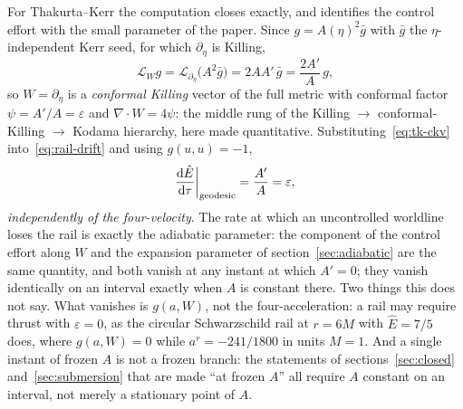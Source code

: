 \documentclass[12pt]{iopart}
\theoremstyle{plain}
\theoremstyle{definition}
\theoremstyle{remark}
\newcommand{\Ehat}{\hat E}
\newcommand{\dd}{\mathrm{d}}
\begin{document}
For Thakurta--Kerr the computation closes exactly, and identifies the control
effort with the small parameter of the paper. Since $g=A(\eta)^2\bar g$ with
$\bar g$ the $\eta$-independent Kerr seed, for which $\partial_\eta$ is Killing,
\begin{equation}
    \mathcal L_Wg=\mathcal L_{\partial_\eta}\!\big(A^2\bar g\big)
      =2AA'\,\bar g=\frac{2A'}{A}\,g ,
    \label{eq:tk-ckv}
\end{equation}
so $W=\partial_\eta$ is a \emph{conformal Killing} vector of the full metric
with conformal factor $\psi=A'/A=\varepsilon$ and $\nabla\!\cdot\!W=4\psi$: the
middle rung of the Killing $\to$ conformal-Killing $\to$ Kodama hierarchy, here
made quantitative. Substituting~\eqref{eq:tk-ckv} into~\eqref{eq:rail-drift} and
using $g(u,u)=-1$,
\begin{equation}
    \frac{\dd\Ehat}{\dd\tau}\bigg|_{\rm geodesic}=\frac{A'}{A}=\varepsilon ,
    \label{eq:tk-drift}
\end{equation}
\emph{independently of the four-velocity}. The rate at which an uncontrolled
worldline loses the rail is exactly the adiabatic parameter: the component of the
control effort along $W$ and the expansion parameter of
section~\ref{sec:adiabatic} are the same quantity, and both vanish at any instant
at which $A'=0$; they vanish identically on an interval exactly when $A$ is
constant there. Two things this does not say. What vanishes is $g(a,W)$, not the
four-acceleration: a rail may require thrust with $\varepsilon=0$, as the circular
Schwarzschild rail at $r=6M$ with $\Ehat=7/5$ does, where $g(a,W)=0$ while
$a^r=-241/1800$ in units $M=1$. And a single instant of frozen $A$ is not a frozen
branch: the statements of sections~\ref{sec:closed} and~\ref{sec:submersion} that
are made ``at frozen $A$'' all require $A$ constant on an interval, not merely a
stationary point of $A$.
\end{document}
